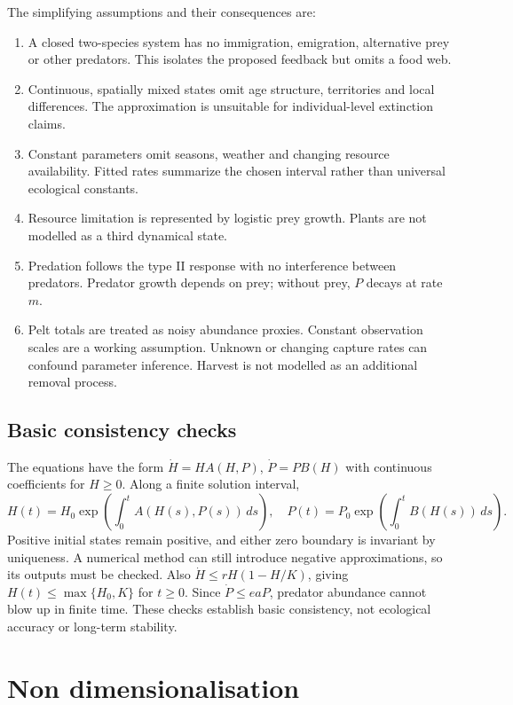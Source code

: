 The simplifying assumptions and their consequences are:
\begin{enumerate}
\item A closed two-species system has no immigration, emigration, alternative prey
or other predators. This isolates the proposed feedback but omits a food web.
\item Continuous, spatially mixed states omit age structure, territories and local
differences. The approximation is unsuitable for individual-level extinction claims.
\item Constant parameters omit seasons, weather and changing resource availability.
Fitted rates summarize the chosen interval rather than universal ecological constants.
\item Resource limitation is represented by logistic prey growth. Plants are not
modelled as a third dynamical state.
\item Predation follows the type II response with no interference between predators.
Predator growth depends on prey; without prey, $P$ decays at rate $m$.
\item Pelt totals are treated as noisy abundance proxies. Constant observation
scales are a working assumption. Unknown or changing capture rates can confound
parameter inference. Harvest is not modelled as an additional removal process.
\end{enumerate}

\subsection{Basic consistency checks}
The equations have the form $\dot H=H A(H,P)$, $\dot P=P B(H)$ with continuous
coefficients for $H\geq0$. Along a finite solution interval,
\begin{equation}
H(t)=H_0\exp\!\left(\int_0^t A(H(s),P(s))\,ds\right),\quad
P(t)=P_0\exp\!\left(\int_0^t B(H(s))\,ds\right).
\end{equation}
Positive initial states remain positive, and either zero boundary is invariant by
uniqueness. A numerical method can still introduce negative approximations, so its
outputs must be checked. Also $\dot H\leq rH(1-H/K)$, giving
$H(t)\leq\max\{H_0,K\}$ for $t\geq0$. Since $\dot P\leq eaP$, predator abundance
cannot blow up in finite time. These checks establish basic consistency, not
ecological accuracy or long-term stability.

\section{Non dimensionalisation}
